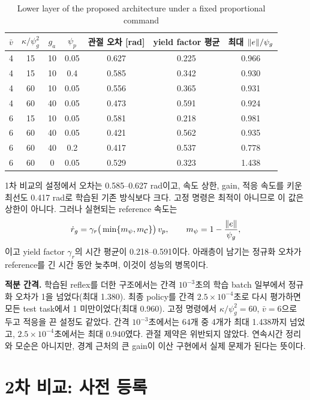 \documentclass[11pt]{article}\usepackage[margin=1in]{geometry}\usepackage{amsmath,amssymb,amsthm,mathtools}\usepackage{graphicx}\graphicspath{{figures/}{../figures/}{figs/}{./}}\usepackage{enumitem}\usepackage{hyperref}\usepackage{cleveref}\usepackage{tikz}\usetikzlibrary{arrows.meta,positioning,calc,shapes.geometric}\usepackage{float}\usepackage[most]{tcolorbox}\usepackage{kotex}\usepackage{booktabs}\emergencystretch=1.6em\tolerance=2000 \crefname{assumption}{Assumption}{Assumptions}\Crefname{assumption}{Assumption}{Assumptions}\crefname{definition}{Definition}{Definitions}\Crefname{definition}{Definition}{Definitions}\crefname{proposition}{Proposition}{Propositions}\Crefname{proposition}{Proposition}{Propositions}\crefname{fact}{Fact}{Facts}\Crefname{fact}{Fact}{Facts} \newtheorem{assumption}{Assumption}\newtheorem{definition}{Definition}\newtheorem{lemma}{Lemma}\newtheorem{proposition}{Proposition}\newtheorem{theorem}{Theorem}\newtheorem{corollary}{Corollary}\newtheorem{fact}{Fact}\theoremstyle{remark}\newtheorem{remark}{Remark} \newcommand{\R}{\mathbb{R}}\newcommand{\U}{\mathcal U}
\begin{document}
\begin{table}[H]
\centering\footnotesize
\caption{Lower layer of the proposed architecture under a fixed proportional command}
\label{tab:scripted}
\begin{tabular}{ccccccc}
\toprule
$\bar v$ & $\kappa/\psi_g^2$ & $g_a$ & $\psi_p$ & 관절 오차 [rad] & yield factor 평균 & 최대 $\lVert e\rVert/\psi_g$ \\
\midrule
4 & 15 & 10 & 0.05 & 0.627 & 0.225 & 0.966 \\
4 & 15 & 10 & 0.4 & 0.585 & 0.342 & 0.930 \\
4 & 60 & 10 & 0.05 & 0.556 & 0.365 & 0.931 \\
4 & 60 & 40 & 0.05 & 0.473 & 0.591 & 0.924 \\
6 & 15 & 10 & 0.05 & 0.581 & 0.218 & 0.981 \\
6 & 60 & 40 & 0.05 & 0.421 & 0.562 & 0.935 \\
6 & 60 & 40 & 0.2 & 0.417 & 0.537 & 0.778 \\
6 & 60 & 0 & 0.05 & 0.529 & 0.323 & 1.438 \\
\bottomrule
\end{tabular}
\end{table}

1차 비교의 설정에서 오차는 0.585--0.627 rad이고, 속도 상한, gain, 적응 속도를 키운 최선도 0.417 rad로 학습된 기존 방식보다 크다. 고정 명령은 최적이 아니므로 이 값은 상한이 아니다. 그러나 실현되는 reference 속도는
\[
\dot r_g=\gamma_r\big(\min\{m_\psi,m_{\mathcal C}\}\big)\,v_p,\qquad m_\psi=1-\frac{\lVert e\rVert}{\psi_g},
\]
이고 yield factor $\gamma_r$의 시간 평균이 0.218--0.591이다. 아래층이 남기는 정규화 오차가 reference를 긴 시간 동안 늦추며, 이것이 성능의 병목이다.

\textbf{적분 간격.} 학습된 reflex를 더한 구조에서는 간격 $10^{-3}$초의 학습 batch 일부에서 정규화 오차가 1을 넘었다(최대 1.380). 최종 policy를 간격 $2.5\times10^{-4}$초로 다시 평가하면 모든 test task에서 1 미만이었다(최대 0.960). 고정 명령에서 $\kappa/\psi_g^2=60$, $\bar v=6$으로 두고 적응을 끈 설정도 같았다. 간격 $10^{-3}$초에서는 64개 중 4개가 최대 1.438까지 넘었고, $2.5\times10^{-4}$초에서는 최대 0.940였다. 관절 제약은 위반되지 않았다. 연속시간 정리와 모순은 아니지만, 경계 근처의 큰 gain이 이산 구현에서 실제 문제가 된다는 뜻이다.

\section{2차 비교: 사전 등록}
\label{sec:round2}
\end{document}
